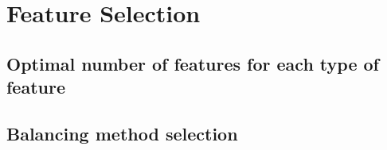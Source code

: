 \section{Feature Selection}

\subsection{Optimal number of features for each type of feature}


\subsection{Balancing method selection}